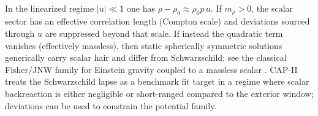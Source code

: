 \begin{remark}
\label{rem:massless_massive_regime}
In the linearized regime $|u|\ll 1$ one has $\rho-\rho_0 \approx \rho_0 p\,u$.
If $m_\rho>0$, the scalar sector has an effective correlation length (Compton scale) and deviations sourced through $u$ are suppressed beyond that scale.
If instead the quadratic term vanishes (effectively massless), then static spherically symmetric solutions generically carry scalar hair and differ from Schwarzschild; see the classical Fisher/JNW family for Einstein gravity coupled to a massless scalar \cite{Fisher1948,JanisNewmanWinicour1968}.
CAP-II treats the Schwarzschild lapse as a benchmark fit target in a regime where scalar backreaction is either negligible or short-ranged compared to the exterior window; deviations can be used to constrain the potential family.
\end{remark}


